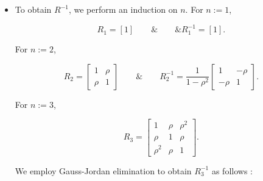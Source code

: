 \documentclass[11pt, a4paper]{article}
\begin{document}
\begin{itemize}

\item[\scalebox{2.0}{\twemoji{keycap: 1}}] \hspace{0.2cm} To obtain $R^{-1}$, we perform an induction on $n$. For $n := 1$,

\begin{equation}
R_1 = [1] \qquad \& \qquad \& R_1^{-1} = [1].
\end{equation}

For $n := 2$,

\begin{equation}
R_2 =
\begin{bmatrix}
1 & \rho \\ \rho & 1
\end{bmatrix}
\qquad \& \qquad
R_2^{-1} =
\dfrac{1}{1-\rho^2}
\begin{bmatrix}
1 & -\rho \\ -\rho & 1
\end{bmatrix}.
\end{equation}

For $n := 3$,

\begin{equation*}
R_3 =
\begin{bmatrix}
1 & \rho & \rho^2 \\
\rho & 1 & \rho \\
\rho^2 & \rho & 1
\end{bmatrix}.
\end{equation*}

We employ Gauss-Jordan elimination to obtain $R_3^{-1}$ as follows :


\end{itemize}
\end{document}
